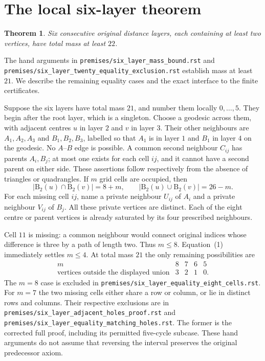 \documentclass[11pt]{article}
\newtheorem{theorem}{Theorem}
\newcommand{\B}{\mathrm B}
\newcommand{\note}[1]{\nolinkurl{#1}}
\begin{document}
\section{The local six-layer theorem}

\begin{theorem}\label{thm:local}
Six consecutive original distance layers, each containing at least two
vertices, have total mass at least $22$.
\end{theorem}

The hand arguments in \note{premises/six_layer_mass_bound.rst} and
\note{premises/six_layer_twenty_equality_exclusion.rst} establish mass at
least $21$. We describe the remaining equality cases and the exact
interface to the finite certificates.

Suppose the six layers have total mass $21$, and number them locally
$0,\ldots,5$. They begin after the root layer, which is a singleton.
Choose a geodesic across them, with adjacent centres $u$ in layer $2$
and $v$ in layer $3$. Their other neighbours are $A_1,A_2,A_3$ and
$B_1,B_2,B_3$, labelled so that $A_1$ is in layer $1$ and $B_1$ in layer
$4$ on the geodesic. No $A$--$B$ edge is possible. A common second
neighbour $C_{ij}$ has parents $A_i,B_j$; at most one exists for each
cell $ij$, and it cannot have a second parent on either side. These
assertions follow respectively from the absence of triangles or
quadrangles. If $m$ grid cells are occupied, then
\[
 |\B_2(u)\cap\B_2(v)|=8+m,\qquad
 |\B_2(u)\cup\B_2(v)|=26-m.                         \tag{1}
\]
For each missing cell $ij$, name a private neighbour $U_{ij}$ of $A_i$
and a private neighbour $V_{ij}$ of $B_j$. All these private vertices
are distinct. Each of the eight centre or parent vertices is already
saturated by its four prescribed neighbours.

Cell $11$ is missing: a common neighbour would connect original indices
whose difference is three by a path of length two. Thus $m\leq8$.
Equation~(1) immediately settles $m\leq4$. At total mass $21$ the only
remaining possibilities are
\[
\begin{array}{c|rrrr}
m&8&7&6&5\\\hline
\text{vertices outside the displayed union}&3&2&1&0.
\end{array}
\]
The $m=8$ case is excluded in
\note{premises/six_layer_equality_eight_cells.rst}.
For $m=7$ the two missing cells either share a row or column, or lie in
distinct rows and columns. Their respective exclusions are in
\note{premises/six_layer_adjacent_holes_proof.rst} and
\note{premises/six_layer_equality_matching_holes.rst}.
The former is the corrected full proof, including its permitted
five-cycle subcase. These hand arguments do not assume that reversing
the interval preserves the original predecessor axiom.
\end{document}
